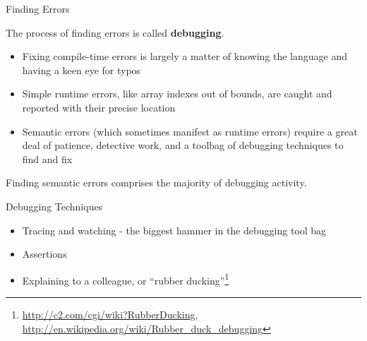 \documentclass{beamer}
\begin{document}
\begin{frame}[fragile]{Finding Errors}


The process of finding errors is called {\bf debugging}.

\begin{itemize}
\item Fixing compile-time errors is largely a matter of knowing the language and having a keen eye for typos
\item Simple runtime errors, like array indexes out of bounds, are caught and reported with their precise location
\item Semantic errors (which sometimes manifest as runtime errors) require a great deal of patience, detective work, and a toolbag of debugging techniques to find and fix
\end{itemize}

Finding semantic errors comprises the majority of debugging activity.

\end{frame}


\begin{frame}[fragile]{Debugging Techniques}


\begin{itemize}
\item Tracing and watching - the biggest hammer in the debugging tool bag
\item Assertions
\item Explaining to a colleague, or ``rubber ducking''\footnote{\url{http://c2.com/cgi/wiki?RubberDucking}, \url{http://en.wikipedia.org/wiki/Rubber_duck_debugging}}
\end{itemize}

\end{frame}
\end{document}
